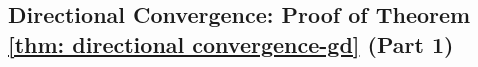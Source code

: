 





\subsection{Directional Convergence: Proof of Theorem \ref{thm: directional convergence-gd} (Part 1)}\label{sec:direct_converge_gd}

